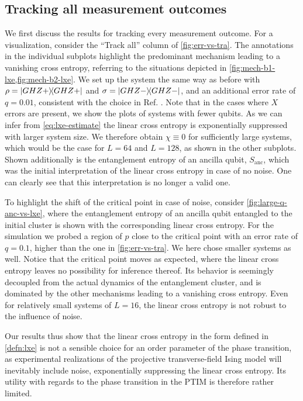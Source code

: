 \subsection{Tracking all measurement outcomes}

We first discuss the results for tracking every measurement outcome. For a
visualization, consider the \enquote{Track all} column of
\cref{fig:err-vs-tra}. The annotations in the individual subplots highlight the
predominant mechanism leading to a vanishing cross entropy, referring to the
situations depicted in \cref{fig:mech-b1-lxe,fig:mech-b2-lxe}.
We set up the system the same way as before with $\rho = \dyad{GHZ+}$ and
$\sigma = \dyad{GHZ-}$, and an additional error rate of $q=0.01$, consistent
with the choice in Ref.  \cite{tikhanovskayaUniversalityCrossEntropy2023}.
Note that in the cases where $X$ errors are present, we show the plots of
systems with fewer qubits. As we can infer from \cref{eq:lxe-estimate} the
linear cross entropy is exponentially suppressed with larger system size. We
therefore obtain $\chi \equiv 0$ for sufficiently large systems, which would be
the case for $L=64$ and $L=128$, as shown in the other subplots. Shown
additionally is the entanglement entropy of an ancilla qubit, $S_\mathrm{anc}$,
which was the initial interpretation of the linear cross entropy in case of no
noise. One can clearly see that this interpretation is no longer a valid one. 

To highlight the shift of the critical point in case of noise, consider
\cref{fig:large-q-anc-vs-lxe}, where the entanglement entropy of an ancilla
qubit entangled to the initial cluster is shown with the corresponding linear
cross entropy. For the simulation we probed a region of $p$ close to the
critical point with an error rate of $q=0.1$, higher than the one in
\cref{fig:err-vs-tra}. We here chose smaller systems as well. Notice that the
critical point moves as expected, where the linear cross entropy leaves no
possibility for inference thereof. Its behavior is seemingly decoupled from the
actual dynamics of the entanglement cluster, and is dominated by the other
mechanisms leading to a vanishing cross entropy. Even for relatively small
systems of $L=16$, the linear cross entropy is not robust to the influence of
noise.

Our results thus show that the linear cross entropy in the form defined in
\cref{defn:lxe} is not a sensible choice for an order parameter of the phase
transition, as experimental realizations of the projective transverse-field
Ising model will inevitably include noise, exponentially suppressing the linear
cross entropy. Its utility with regards to the phase transition in the PTIM is
therefore rather limited.

